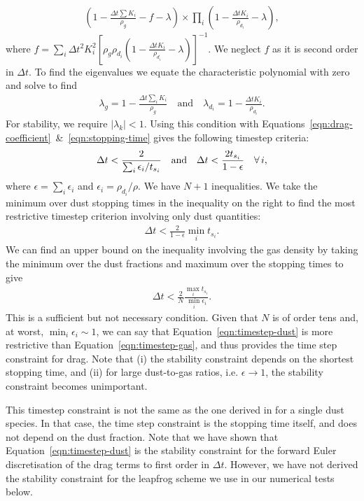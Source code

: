 \documentclass[fleqn,usenatbib]{mnras}
\begin{document}
%
\begin{align}
   \left(1 - \frac{\Delta t \sum K_i}{\rho_g} - f - \lambda\right)
   \times \prod_i \left(1 - \frac{\Delta t K_i}{\rho_{d_i}} - \lambda\right),
\end{align}
%
where \(f = \sum_i \Delta t^2 K_i^2 \left[\rho_g \rho_{d_i} \left( 1 -
\frac{\Delta t K_i}{\rho_{d_i}} - \lambda \right) \right]^{-1}\). We neglect
\(f\) as it is second order in \(\Delta t\). To find the eigenvalues we equate
the characteristic polynomial with zero and solve to find
%
\begin{align}
   \lambda_g = 1 - \frac{\Delta t \sum_i K_i}{\rho_g} \quad \mathrm{and} \quad
   \lambda_{d_i} = 1 - \frac{\Delta t K_i}{\rho_{d_i}}.
\end{align}
%
For stability, we require \(|\lambda_k| < 1\). Using this condition with
Equations~\ref{eqn:drag-coefficient}~\&~\ref{eqn:stopping-time} gives the
following timestep criteria:
%
\begin{align}
   \Delta t < \frac{2}{\sum_i \epsilon_i / t_{s_i}} \quad {\rm and} \quad
   \Delta t < \frac{2 t_{s_i}}{1 - \epsilon} \quad \forall \, i,
\end{align}
%
where \(\epsilon = \sum_i \epsilon_i\) and \(\epsilon_i = \rho_{d_i} / \rho\).
We have \(N + 1\) inequalities. We take the minimum over dust stopping times in
the inequality on the right to find the most restrictive timestep criterion
involving only dust quantities:
%
\begin{align}
   \label{eqn:timestep-dust}
   \Delta t < \frac{2}{1 - \epsilon} \min_i t_{s_i}.
\end{align}
%
We can find an upper bound on the inequality involving the gas density by taking
the minimum over the dust fractions and maximum over the stopping times to give
%
\begin{align}
   \label{eqn:timestep-gas}
   \Delta t < \frac{2}{N} \frac{\max_i t_{s_i}}{\min_i \epsilon_i}.
\end{align}
%
This is a sufficient but not necessary condition. Given that \(N\) is of order
tens and, at worst, \(\min_i \epsilon_i \sim 1\), we can say that
Equation~\ref{eqn:timestep-dust} is more restrictive than
Equation~\ref{eqn:timestep-gas}, and thus provides the time step constraint for
drag. Note that (i) the stability constraint depends on the shortest stopping
time, and (ii) for large dust-to-gas ratios, i.e. \(\epsilon \rightarrow 1\),
the stability constraint becomes unimportant.

This timestep constraint is not the same as the one derived in
\citet{Laibe2012MNRAS.420.2345L} for a single dust species. In that case, the
time step constraint is the stopping time itself, and does not depend on the
dust fraction. Note that we have shown that Equation~\ref{eqn:timestep-dust} is
the stability constraint for the forward Euler discretisation of the drag terms
to first order in \(\Delta t\). However, we have not derived the stability
constraint for the leapfrog scheme we use in our numerical tests below.
\end{document}
